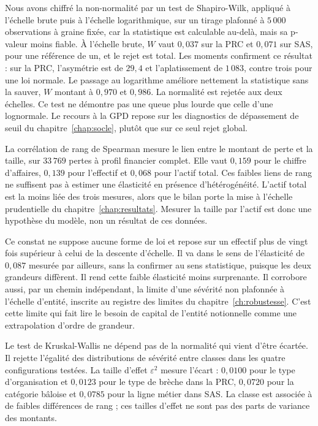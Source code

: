Nous avons chiffré la non-normalité par un test de Shapiro-Wilk, appliqué à l'échelle brute puis à
l'échelle logarithmique, sur un tirage plafonné à $5\,000$ observations à graine fixée, car la statistique
est calculable au-delà, mais sa p-valeur moins fiable. À l'échelle brute, $W$ vaut $0{,}037$ sur la PRC et $0{,}071$
sur SAS, pour une référence de un, et le rejet est total. Les moments confirment ce résultat : sur la
PRC, l'asymétrie est de $29{,}4$ et l'aplatissement de $1\,083$, contre trois pour une loi normale. Le
passage au logarithme améliore nettement la statistique sans la sauver, $W$ montant à $0{,}970$ et
$0{,}986$. La normalité est rejetée aux deux échelles. Ce test ne démontre pas une queue plus lourde
que celle d'une lognormale. Le recours à la GPD repose sur les diagnostics de dépassement de seuil
du chapitre~\ref{chap:socle}, plutôt que sur ce seul rejet global.

La corrélation de rang de Spearman mesure le lien entre le montant de perte et la taille, sur
$33\,769$ pertes à profil financier complet. Elle vaut $0{,}159$ pour le chiffre d'affaires, $0{,}139$
pour l'effectif et $0{,}068$ pour l'actif total. Ces faibles liens de rang ne suffisent pas à estimer
une élasticité en présence d'hétérogénéité. L'actif total est la moins liée des trois mesures, alors que
le bilan porte la mise à l'échelle prudentielle du chapitre~\ref{chap:resultats}.
Mesurer la taille par l'actif est donc une hypothèse du modèle, non un résultat de ces données.

Ce constat ne suppose aucune forme de loi et repose sur
un effectif plus de vingt fois supérieur à celui de la descente d'échelle. Il va dans le sens de l'élasticité de
$0{,}087$ mesurée par ailleurs, sans la confirmer au sens statistique, puisque les deux grandeurs
diffèrent. Il rend cette faible élasticité moins surprenante. Il corrobore aussi, par un chemin
indépendant, la limite d'une sévérité non plafonnée à l'échelle d'entité, inscrite au registre des
limites du chapitre~\ref{ch:robustesse}. C'est cette limite qui fait lire le besoin de capital de
l'entité notionnelle comme une extrapolation d'ordre de grandeur.

Le test de Kruskal-Wallis ne dépend pas de la normalité qui vient d'être écartée. Il rejette l'égalité
des distributions de sévérité entre classes dans les quatre configurations testées. La taille d'effet
$\varepsilon^2$ mesure l'écart : $0{,}0100$ pour le type d'organisation et $0{,}0123$ pour le type de
brèche dans la PRC, $0{,}0720$ pour la catégorie bâloise et $0{,}0785$ pour la ligne métier dans SAS. La
classe est associée à de faibles différences de rang ; ces tailles d'effet ne sont pas des parts de variance des montants.

